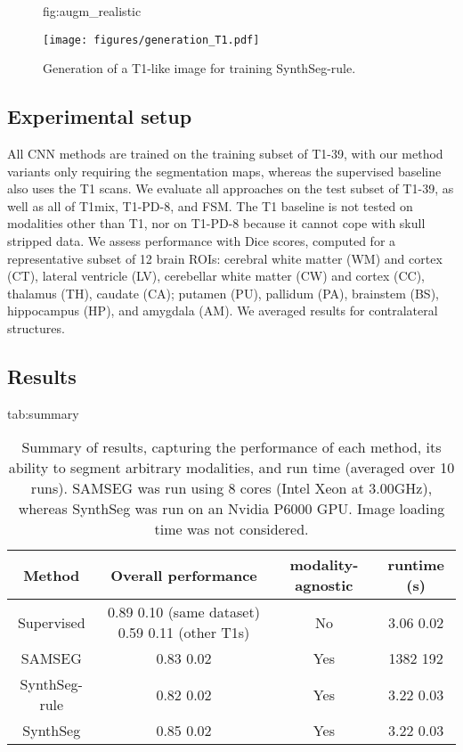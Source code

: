 \documentclass{midl}
\newcommand{\netname}{SynthSeg}
\begin{document}
\begin{figure}[t]
\floatconts
  {fig:augm_realistic}
  {\caption{Generation of a T1-like image for training \netname{}-rule.}}
  {\centering\texttt{[image: figures/generation\_T1.pdf]}}
\end{figure}


\subsection{Experimental setup}

All CNN methods are trained on the training subset of T1-39, with our method variants only requiring the segmentation maps, whereas the supervised baseline also uses the T1 scans. We evaluate all approaches on the test subset of T1-39, as well as all of T1mix, T1-PD-8, and FSM. The T1 baseline is not tested on modalities other than T1, nor on T1-PD-8 because it cannot cope with skull stripped data. We assess performance with Dice scores, computed for a representative subset of 12 brain ROIs: cerebral white matter (WM) and cortex (CT), lateral ventricle (LV), cerebellar white matter (CW) and cortex (CC), thalamus (TH), caudate (CA); putamen (PU), pallidum (PA), brainstem (BS), hippocampus (HP), and amygdala (AM). We averaged results for contralateral structures. 


\subsection{Results}

\begin{table}[tbp]
\setlength\tabcolsep{3pt} 
\floatconts
  {tab:summary}
  {\caption{Summary of results, capturing the performance of each method, its ability to segment arbitrary modalities, and run time (averaged over 10 runs). SAMSEG was run using 8 cores (Intel Xeon at 3.00GHz), whereas \netname{} was run on an Nvidia P6000 GPU. Image loading time was not considered.}}
  {\small \begin{tabular}{c || c |  c |  c}
  \hline
  Method & Overall performance & modality-agnostic & runtime (s)  \\
  \hline \hline
 Supervised & 0.89  0.10 (same dataset) 0.59  0.11 (other T1s) & No & 3.06  0.02\\  
 SAMSEG & 0.83  0.02  & Yes & 1382  192\\  
 \netname{}-rule & 0.82  0.02 & Yes & 3.22  0.03\\  
 \netname{} & 0.85  0.02 & Yes & 3.22  0.03\\  
  \hline
  \end{tabular}}
\end{table}
\end{document}
